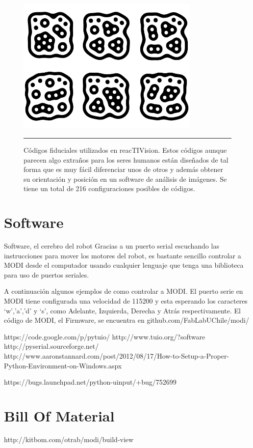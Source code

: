 \begin{figure}[htbp]
	\centering
		\includegraphics[width=0.8\textwidth]{./Figures/MODI/fiducial.png}
		\rule{35em}{0.5pt}
	\caption[Fiducial]{Códigos fiduciales utilizados en reacTIVision. Estos códigos aunque parecen algo extraños para los seres humanos están diseñados de tal forma que es muy fácil diferenciar unos de otros y además obtener su orientación y posición en un software de análisis de imágenes. Se tiene un total de 216 configuraciones posibles de códigos.}
	\label{fig:Fiducial}
\end{figure}


\section{Software}
Software, el cerebro del robot
Gracias a un puerto serial escuchando las instrucciones para mover los motores del robot, es bastante sencillo controlar a MODI desde el computador usando cualquier lenguaje que tenga una biblioteca para uso de puertos seriales.

A continuación algunos ejemplos de como controlar a MODI. El puerto serie en MODI tiene configurada una velocidad de 115200 y esta esperando los caracteres ‘w’,’a’,’d’ y ‘s’, como Adelante, Izquierda, Derecha y Atrás respectivamente. El código de MODI, el Firmware, se encuentra en github.com/FabLabUChile/modi/


https://code.google.com/p/pytuio/
http://www.tuio.org/?software
http://pyserial.sourceforge.net/
http://www.aaronstannard.com/post/2012/08/17/How-to-Setup-a-Proper-Python-Environment-on-Windows.aspx

https://bugs.launchpad.net/python-uinput/+bug/752699



\section{Bill Of Material}
http://kitbom.com/otrab/modi/build-view